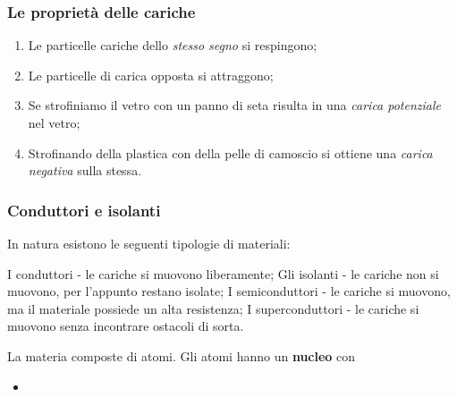 \documentclass{book}
\begin{document}
\subsubsection{Le proprietà delle cariche}
\begin{enumerate}
	\item Le particelle cariche dello \textit{stesso segno} si respingono;
	\item Le particelle di carica opposta si attraggono;
	\item Se strofiniamo il vetro con un panno di seta risulta in una
		\textit{carica potenziale} nel vetro;
	\item Strofinando della plastica con della pelle di camoscio si ottiene una
		\textit{carica negativa} sulla stessa.
\end{enumerate}
\subsubsection{Conduttori e isolanti}
In natura esistono le seguenti tipologie di materiali:
\begin{tasks}{2}
	\task I conduttori - le cariche si muovono liberamente;
	\task Gli isolanti - le cariche non si muovono, per l'appunto restano
	isolate;
	\task I semiconduttori - le cariche si muovono, ma il materiale possiede un
	alta resistenza;
	\task I superconduttori - le cariche si muovono senza incontrare ostacoli
	di sorta.
\end{tasks}
\newtheorem{pcariche}{Particelle Cariche}
\begin{pcarica}
	La materia composte di atomi. Gli atomi hanno un \textbf{nucleo} con
	\begin{itemize}
		\item 
	\end{itemize}

\end{pcarica}
\end{document}
